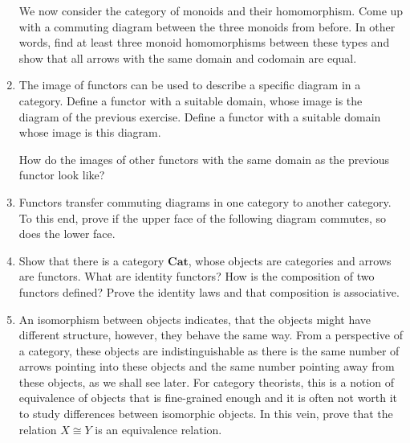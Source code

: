 \documentclass{scrartcl}
\begin{document}
\begin{enumerate}
  We now consider the category of monoids and their homomorphism.
  Come up with a commuting diagram between the three monoids from before.
  In other words, find at least three monoid homomorphisms between these types and show that all arrows with the same domain and codomain are equal.

\item
  The image of functors can be used to describe a specific diagram in a category.
  Define a functor with a suitable domain, whose image is the diagram of the previous exercise.
  Define a functor with a suitable domain whose image is this diagram.
  \begin{center}
  \end{center}
  How do the images of other functors with the same domain as the previous functor look like?

\item Functors transfer commuting diagrams in one category to another category.
  To this end, prove if the upper face of the following diagram commutes, so does the lower face.
  \begin{center}
  \end{center}

\item
  Show that there is a category $\mathbf{Cat}$, whose objects are categories and arrows are functors.
  What are identity functors?
  How is the composition of two functors defined?
  Prove the identity laws and that composition is associative.

\item
  An isomorphism between objects indicates, that the objects might have different structure, however, they behave the same way.
  From a perspective of a category, these objects are indistinguishable as there is the same number of arrows pointing into these objects and the same number pointing away from these objects, as we shall see later.
  For category theorists, this is a notion of equivalence of objects that is fine-grained enough and it is often not worth it to study differences between isomorphic objects.
  In this vein, prove that the relation $X \cong Y$ is an equivalence relation.


\end{enumerate}
\end{document}
